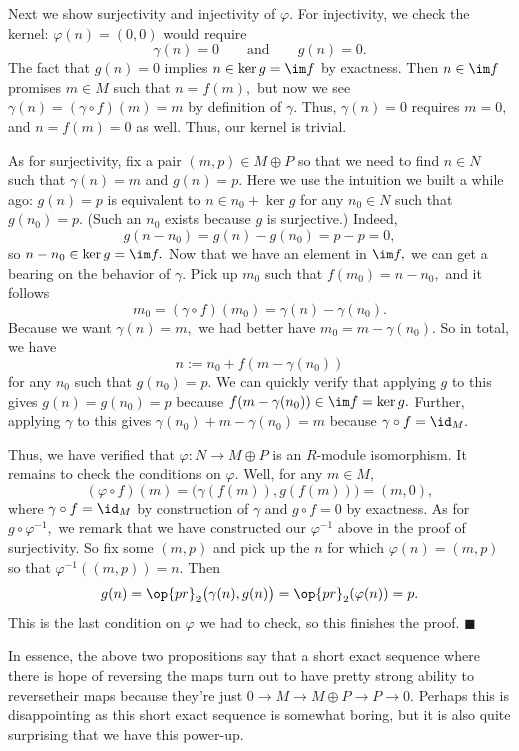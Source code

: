 Next we show surjectivity and injectivity of $\varphi.$ For injectivity, we check the kernel: $\varphi(n)=(0,0)$ would require
\[\gamma(n)=0\qquad\text{and}\qquad g(n)=0.\]
The fact that $g(n)=0$ implies $n\in\ker g=\im f$ by exactness. Then $n\in\im f$ promises $m\in M$ such that $n=f(m),$ but now we see $\gamma(n)=(\gamma\circ f)(m)=m$ by definition of $\gamma.$ Thus, $\gamma(n)=0$ requires $m=0,$ and $n=f(m)=0$ as well. Thus, our kernel is trivial.

As for surjectivity, fix a pair $(m,p)\in M\oplus P$ so that we need to find $n\in N$ such that $\gamma(n)=m$ and $g(n)=p.$ Here we use the intuition we built a while ago: $g(n)=p$ is equivalent to $n\in n_0+\ker g$ for any $n_0\in N$ such that $g(n_0)=p.$ (Such an $n_0$ exists because $g$ is surjective.) Indeed,
\[g(n-n_0)=g(n)-g(n_0)=p-p=0,\]
so $n-n_0\in\ker g=\im f.$ Now that we have an element in $\im f,$ we can get a bearing on the behavior of $\gamma.$ Pick up $m_0$ such that $f(m_0)=n-n_0,$ and it follows
\[m_0=(\gamma\circ f)(m_0)=\gamma(n)-\gamma(n_0).\]
Because we want $\gamma(n)=m,$ we had better have $m_0=m-\gamma(n_0).$ So in total, we have
\[n:=n_0+f(m-\gamma(n_0))\]
for any $n_0$ such that $g(n_0)=p.$ We can quickly verify that applying $g$ to this gives $g(n)=g(n_0)=p$ because $f(m-\gamma(n_0))\in\im f=\ker g.$ Further, applying $\gamma$ to this gives $\gamma(n_0)+m-\gamma(n_0)=m$ because $\gamma\circ f=\id_M.$

Thus, we have verified that $\varphi:N\to M\oplus P$ is an $R$-module isomorphism. It remains to check the conditions on $\varphi.$ Well, for any $m\in M,$
\[(\varphi\circ f)(m)=\big(\gamma(f(m)),g(f(m))\big)=(m,0),\]
where $\gamma\circ f=\id_M$ by construction of $\gamma$ and $g\circ f=0$ by exactness. As for $g\circ\varphi^{-1},$ we remark that we have constructed our $\varphi^{-1}$ above in the proof of surjectivity. So fix some $(m,p)$ and pick up the $n$ for which $\varphi(n)=(m,p)$ so that $\varphi^{-1}((m,p))=n.$ Then
\[g(n)=\op{pr}_2\big(\gamma(n),g(n)\big)=\op{pr}_2(\varphi(n))=p.\]
This is the last condition on $\varphi$ we had to check, so this finishes the proof. $\blacksquare$

In essence, the above two propositions say that a short exact sequence where there is hope of reversing the maps turn out to have pretty strong ability to reversetheir maps because they're just $0\to M\to M\oplus P\to P\to 0.$ Perhaps this is disappointing as this short exact sequence is somewhat boring, but it is also quite surprising that we have this power-up.

